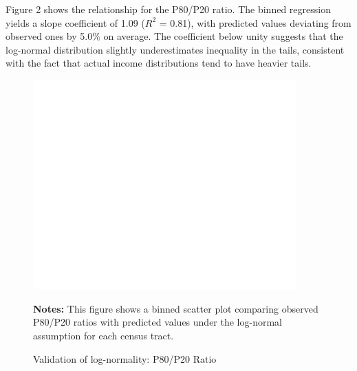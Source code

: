 Figure 2 shows the relationship for the P80/P20 ratio. The binned regression yields a slope coefficient of 1.09 ($R^2$ = 0.81), with predicted values deviating from observed ones by 5.0\% on average. The coefficient below unity suggests that the log-normal distribution slightly underestimates inequality in the tails, consistent with the fact that actual income distributions tend to have heavier tails.

\begin{figure}[H]
\begin{center}
\captionsetup{justification=centering}
\caption{Validation of log-normality: P80/P20 Ratio}
\label{fig:p80p20}
\includegraphics[width=0.9\textwidth]{output/binned_scatter_p80p20.png}
\end{center}
\begin{fignotes}
\textbf{Notes:} This figure shows a binned scatter plot comparing observed P80/P20 ratios with predicted values under the log-normal assumption for each census tract.
\end{fignotes}
\end{figure}